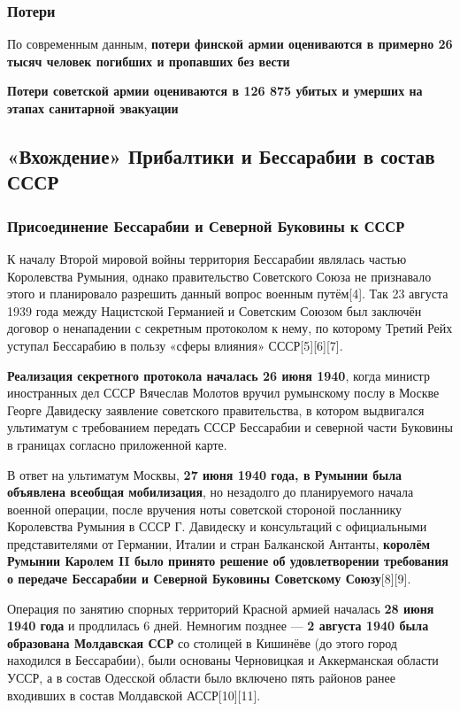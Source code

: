 \documentclass{article}
\begin{document}
\subsubsection{Потери}

По современным данным, \textbf{потери финской армии оцениваются в примерно 26 тысяч человек погибших и пропавших без вести}

\textbf{Потери советской армии оцениваются в 126 875 убитых и умерших на этапах санитарной эвакуации}

\pagebreak
\subsection{«Вхождение» Прибалтики и Бессарабии в состав СССР}

\subsubsection{Присоединение Бессарабии и Северной Буковины к СССР}

К началу Второй мировой войны территория Бессарабии являлась частью Королевства Румыния, однако правительство Советского Союза не признавало этого и планировало разрешить данный вопрос военным путём[4]. Так 23 августа 1939 года между Нацистской Германией и Советским Союзом был заключён договор о ненападении с секретным протоколом к нему, по которому Третий Рейх уступал Бессарабию в пользу «сферы влияния» СССР[5][6][7].

\hfill

\textbf{Реализация секретного протокола началась 26 июня 1940}, когда министр иностранных дел СССР Вячеслав Молотов вручил румынскому послу в Москве Георге Давидеску заявление советского правительства, в котором выдвигался ультиматум с требованием передать СССР Бессарабии и северной части Буковины в границах согласно приложенной карте.

\hfill

В ответ на ультиматум Москвы, \textbf{27 июня 1940 года, в Румынии была объявлена всеобщая мобилизация}, но незадолго до планируемого начала военной операции, после вручения ноты советской стороной посланнику Королевства Румыния в СССР Г. Давидеску и консультаций с официальными представителями от Германии, Италии и стран Балканской Антанты, \textbf{королём Румынии Каролем II было принято решение об удовлетворении требования о передаче Бессарабии и Северной Буковины Советскому Союзу}[8][9].

\hfill

Операция по занятию спорных территорий Красной армией началась \textbf{28 июня 1940 года} и продлилась 6 дней. Немногим позднее — \textbf{2 августа 1940 была образована Молдавская ССР} со столицей в Кишинёве (до этого город находился в Бессарабии), были основаны Черновицкая и Аккерманская области УССР, а в состав Одесской области было включено пять районов ранее входивших в состав Молдавской АССР[10][11].
\end{document}
